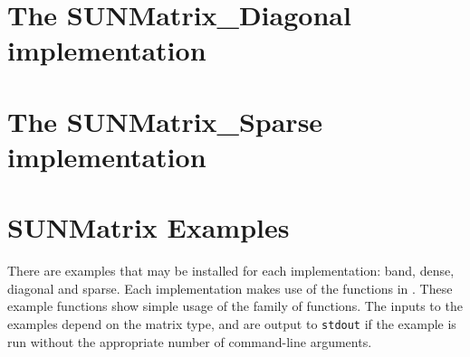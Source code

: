 \section{The SUNMatrix\_Diagonal implementation}\label{ss:sunmat_diag}


\section{The SUNMatrix\_Sparse implementation}\label{ss:sunmat_sparse}



\section{SUNMatrix Examples}\label{ss:sunmat_examples}

There are  examples that may be installed for each
implementation: band, dense, diagonal and sparse.  Each implementation
makes use of the functions in . 
These example functions show simple usage of the  family
of functions.  The inputs to the examples depend on the matrix type,
and are output to \texttt{stdout} if the example is run without the
appropriate number of command-line arguments. 

